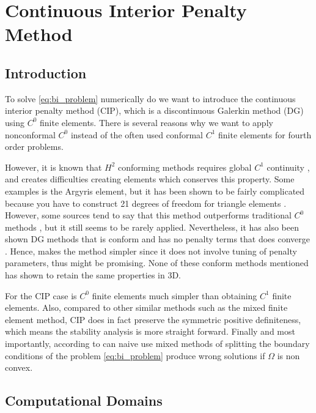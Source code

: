 \newpage
\section{Continuous Interior Penalty Method}%
\label{sec:continious_interior_penalty_method}


\subsection{Introduction}%
\label{sub:introduction}

To solve \eqref{eq:bi_problem} numerically do we want to introduce the continuous interior penalty method (CIP), which is a discontinuous Galerkin
method (DG) using $C^{0}$ finite elements. There is several reasons why we want to apply nonconformal $C^{0}$ instead of the often used conformal $C^{1}$ finite elements for fourth order problems.

However, it is known that $ H^{2}$ conforming methods requires global $C^{1}$ continuity \cite{ye19}, and creates difficulties creating elements which conserves this property. Some examples is the Argyris element, but it has been shown to be fairly
complicated because you have to construct 21 degrees of freedom for triangle elements \cite{ nair21, brenner07math}. However, some sources tend to say that this method outperforms traditional $C^{0}$ methods \cite{kirby18}, but it still seems to be rarely applied.
Nevertheless, it has also been shown DG methods that is conform and has no penalty terms that does converge \cite{ye19}. Hence, makes the method simpler since it does not involve tuning of penalty parameters, thus might be promising. None of these conform methods mentioned has shown to retain the same properties in 3D.

For the CIP case is $C^0$ finite elements much simpler than obtaining $C^{1}$ finite elements. Also, compared to other similar methods such as the mixed finite element method, CIP does in fact preserve the symmetric positive definiteness, which means
the stability analysis is more straight forward. Finally and most importantly, according to \cite{brenner2012quadratic} can naive use mixed methods of splitting the boundary conditions of
the problem \eqref{eq:bi_problem} produce wrong solutions if $\Omega $ is non convex.

\subsection{Computational Domains}%
\label{sub:computational_domain}

